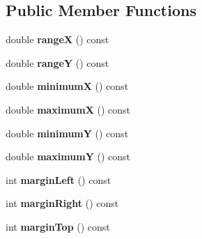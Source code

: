 \subsection*{Public Member Functions}
\begin{DoxyCompactItemize}
\item 
\hypertarget{class_graph_view_abstract_a4f0aeccd75c3ec76e0bc0e0f416efaba}{double {\bfseries range\-X} () const }\label{class_graph_view_abstract_a4f0aeccd75c3ec76e0bc0e0f416efaba}

\item 
\hypertarget{class_graph_view_abstract_ab5ef9d5f17407921948b073ef9b7555a}{double {\bfseries range\-Y} () const }\label{class_graph_view_abstract_ab5ef9d5f17407921948b073ef9b7555a}

\item 
\hypertarget{class_graph_view_abstract_a58aacb04d35b7d5e9182e17bcca2ecb2}{double {\bfseries minimum\-X} () const }\label{class_graph_view_abstract_a58aacb04d35b7d5e9182e17bcca2ecb2}

\item 
\hypertarget{class_graph_view_abstract_a2fc98cb24290dee8970be733b283b9d0}{double {\bfseries maximum\-X} () const }\label{class_graph_view_abstract_a2fc98cb24290dee8970be733b283b9d0}

\item 
\hypertarget{class_graph_view_abstract_af4757e7f276a2d591aff855cf368bd9b}{double {\bfseries minimum\-Y} () const }\label{class_graph_view_abstract_af4757e7f276a2d591aff855cf368bd9b}

\item 
\hypertarget{class_graph_view_abstract_a366fabf18dbee413a82fbae07747915f}{double {\bfseries maximum\-Y} () const }\label{class_graph_view_abstract_a366fabf18dbee413a82fbae07747915f}

\item 
\hypertarget{class_graph_view_abstract_acaa21d764de21fa80720c6f671523fe1}{int {\bfseries margin\-Left} () const }\label{class_graph_view_abstract_acaa21d764de21fa80720c6f671523fe1}

\item 
\hypertarget{class_graph_view_abstract_aab3a3ecbda7a1a79fe36d9d9ce005cf7}{int {\bfseries margin\-Right} () const }\label{class_graph_view_abstract_aab3a3ecbda7a1a79fe36d9d9ce005cf7}

\item 
\hypertarget{class_graph_view_abstract_a0a6421fc7637cee4ad475bd4ca67039e}{int {\bfseries margin\-Top} () const }\label{class_graph_view_abstract_a0a6421fc7637cee4ad475bd4ca67039e}


\end{DoxyCompactItemize}
